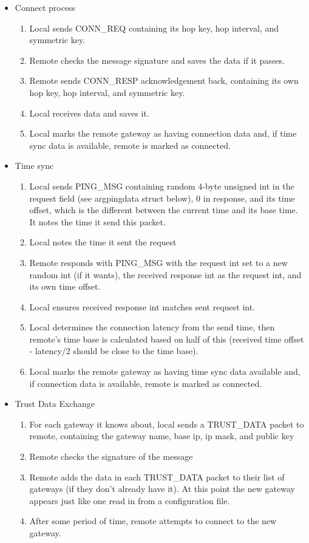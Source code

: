 \begin{itemize}
\item Connect process
	\begin{enumerate}
		\item Local sends CONN\_REQ containing its hop key, hop interval, and symmetric key. 
		\item Remote checks the message signature and saves the data if it passes.
		\item Remote sends CONN\_RESP acknowledgement back, containing its own hop key, hop interval, and symmetric key. 
		\item Local receives data and saves it.
		\item Local marks the remote gateway as having connection data and, if time sync data is available, remote is marked as connected. 
	\end{enumerate}

\item Time sync
	\begin{enumerate}
		\item Local sends PING\_MSG containing random 4-byte unsigned int in the request field (see argpingdata struct below), 0 in response, and its time offset, which is the different between the current time and its base time. It notes the time it send this packet. 
		\item Local notes the time it sent the request
		\item Remote responds with PING\_MSG with the request int set to a new random int (if it wants), the received response int as the request int, and its own time offset.
		\item Local ensures received response int matches sent request int.
		\item Local determines the connection latency from the send time, then remote's time base is calculated based on half of this (received time offset - latency/2 should be close to the time base).
		\item Local marks the remote gateway as having time sync data available and, if connection data is available, remote is marked as connected. 
	\end{enumerate}

\item Trust Data Exchange
	\begin{enumerate}
		\item For each gateway it knows about, local sends a TRUST\_DATA packet to remote, containing the gateway name, base ip, ip mask, and public key
		\item Remote checks the signature of the message
		\item Remote adds the data in each TRUST\_DATA packet to their list of gateways (if they don't already have it). At this point the new gateway appears just like one read in from a configuration file.
		\item After some period of time, remote attempts to connect to the new gateway.
	 \end{enumerate}


\end{itemize}
